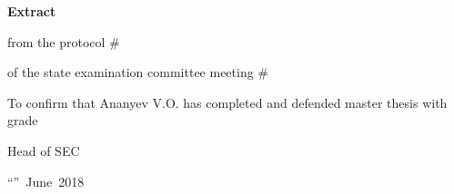 
\begin{titlepage}

    \vspace*{6cm}

    \begin{center}
        \textbf{Extract}

        from the protocol \#

        of the state examination committee meeting \#
    \end{center}

    \vspace{2cm}

    \noindent To confirm that Ananyev V.O. has completed and defended master thesis with grade 

    \vspace{2cm}

    \flushright

    Head of SEC 

    ``''~June~2018

\end{titlepage}
